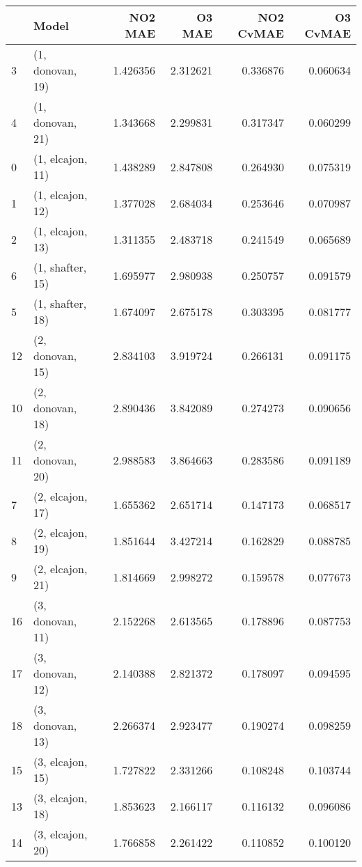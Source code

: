 \begin{tabular}{llrrrr}
\toprule
{} &             Model &   NO2 MAE &    O3 MAE &  NO2 CvMAE &  O3 CvMAE \\
\midrule
3  &  (1, donovan, 19) &  1.426356 &  2.312621 &   0.336876 &  0.060634 \\
4  &  (1, donovan, 21) &  1.343668 &  2.299831 &   0.317347 &  0.060299 \\
0  &  (1, elcajon, 11) &  1.438289 &  2.847808 &   0.264930 &  0.075319 \\
1  &  (1, elcajon, 12) &  1.377028 &  2.684034 &   0.253646 &  0.070987 \\
2  &  (1, elcajon, 13) &  1.311355 &  2.483718 &   0.241549 &  0.065689 \\
6  &  (1, shafter, 15) &  1.695977 &  2.980938 &   0.250757 &  0.091579 \\
5  &  (1, shafter, 18) &  1.674097 &  2.675178 &   0.303395 &  0.081777 \\
12 &  (2, donovan, 15) &  2.834103 &  3.919724 &   0.266131 &  0.091175 \\
10 &  (2, donovan, 18) &  2.890436 &  3.842089 &   0.274273 &  0.090656 \\
11 &  (2, donovan, 20) &  2.988583 &  3.864663 &   0.283586 &  0.091189 \\
7  &  (2, elcajon, 17) &  1.655362 &  2.651714 &   0.147173 &  0.068517 \\
8  &  (2, elcajon, 19) &  1.851644 &  3.427214 &   0.162829 &  0.088785 \\
9  &  (2, elcajon, 21) &  1.814669 &  2.998272 &   0.159578 &  0.077673 \\
16 &  (3, donovan, 11) &  2.152268 &  2.613565 &   0.178896 &  0.087753 \\
17 &  (3, donovan, 12) &  2.140388 &  2.821372 &   0.178097 &  0.094595 \\
18 &  (3, donovan, 13) &  2.266374 &  2.923477 &   0.190274 &  0.098259 \\
15 &  (3, elcajon, 15) &  1.727822 &  2.331266 &   0.108248 &  0.103744 \\
13 &  (3, elcajon, 18) &  1.853623 &  2.166117 &   0.116132 &  0.096086 \\
14 &  (3, elcajon, 20) &  1.766858 &  2.261422 &   0.110852 &  0.100120 \\
\bottomrule
\end{tabular}
